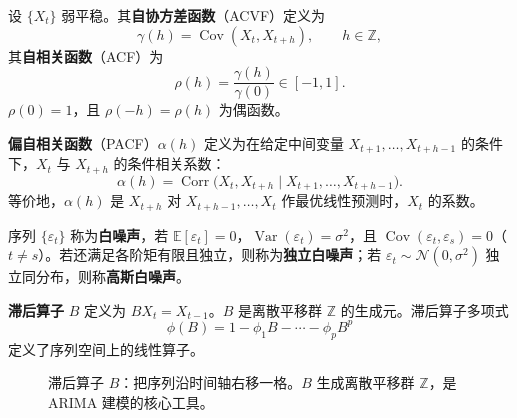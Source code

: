 \begin{definition}[自协方差函数与自相关函数]\label{def:ts_acf}
设 $\{X_t\}$ 弱平稳。其\textbf{自协方差函数}（ACVF）定义为
\[
\gamma(h)=\operatorname{Cov}(X_t,X_{t+h}),\qquad h\in\mathbb{Z},
\]
其\textbf{自相关函数}（ACF）为
\[
\rho(h)=\frac{\gamma(h)}{\gamma(0)}\in[-1,1].
\]
$\rho(0)=1$，且 $\rho(-h)=\rho(h)$ 为偶函数。
\end{definition}

\begin{definition}[偏自相关函数]\label{def:ts_pacf}
\textbf{偏自相关函数}（PACF）$\alpha(h)$ 定义为在给定中间变量 $X_{t+1},\dots,X_{t+h-1}$ 的条件下，$X_t$ 与 $X_{t+h}$ 的条件相关系数：
\[
\alpha(h)=\operatorname{Corr}\bigl(X_t,X_{t+h}\mid X_{t+1},\dots,X_{t+h-1}\bigr).
\]
等价地，$\alpha(h)$ 是 $X_{t+h}$ 对 $X_{t+h-1},\dots,X_t$ 作最优线性预测时，$X_t$ 的系数。
\end{definition}

\begin{definition}[白噪声]\label{def:ts_white_noise}
序列 $\{\varepsilon_t\}$ 称为\textbf{白噪声}，若 $\mathbb{E}[\varepsilon_t]=0$，$\operatorname{Var}(\varepsilon_t)=\sigma^2$，且 $\operatorname{Cov}(\varepsilon_t,\varepsilon_s)=0$（$t\neq s$）。若还满足各阶矩有限且独立，则称为\textbf{独立白噪声}；若 $\varepsilon_t\sim\mathcal{N}(0,\sigma^2)$ 独立同分布，则称\textbf{高斯白噪声}。
\end{definition}

\begin{definition}[滞后算子]\label{def:ts_lag_operator}
\textbf{滞后算子} $B$ 定义为 $BX_t = X_{t-1}$。$B$ 是离散平移群 $\mathbb{Z}$ 的生成元。滞后算子多项式
\[
\phi(B) = 1 - \phi_1 B - \cdots - \phi_p B^p
\]
定义了序列空间上的线性算子。
\end{definition}

\begin{figure}[htbp]
\centering
{}
\caption{滞后算子 $B$：把序列沿时间轴右移一格。$B$ 生成离散平移群 $\mathbb{Z}$，是 ARIMA 建模的核心工具。}
\label{fig:lag_operator}
\end{figure}

